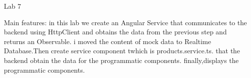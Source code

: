 Lab 7

Main features:
in this lab we create an Angular Service that communicates to the backend using HttpClient and obtains the data from the previous step and returns an Observable. 
i moved the content of mock data to Realtime Database.Then create service component twhich  is products.service.ts. that the backend obtain the data for the programmatic components.
finally,displays the programmatic components.